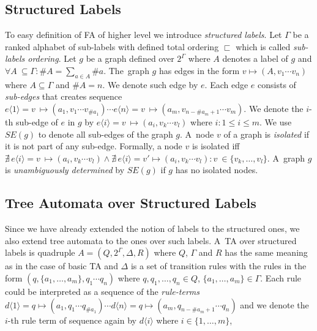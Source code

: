 \subsection{Structured Labels}
\label{subsec:structlab}
To easy definition of FA of higher level we introduce
\emph{structured labels}.
Let $\Gamma$ be a ranked alphabet of sub-labels with defined total ordering $\sqsubset$ which is called \emph{sub-labels ordering}.
Let $g$ be a graph defined over $2^\Gamma$ where $A$ denotes a label of $g$ and $\forall A~\subseteq \Gamma: \#A = \sum_{a\in A} \#a$.
The~graph $g$ has edges in the form $v \mapsto (A,v_1 \cdots v_n)$ where
$A \subseteq \Gamma$ and $\#A = n$.
We denote such edge by $e$.
Each edge $e$ consists of \emph{sub-edges} that creates sequence
$e\langle 1\rangle = v~\mapsto (a_1,v_1 \cdots v_{\#a_1}) \cdots e\langle n\rangle= v~\mapsto (a_m,v_{n-\#a_m+1} \cdots v_m)$.
We denote the $i$-th sub-edge of $e$ in $g$ by $e\langle i\rangle = v~\mapsto (a_i,v_k \cdots v_l)$ where $i: 1 \leq i \leq m$.
We use $SE(g)$ to denote all sub-edges of the graph $g$.
A~node $v$ of a graph is \emph{isolated} if it is not part of any sub-edge.
Formally, a node $v$ is isolated
iff $\nexists\, e\langle i\rangle = v~\mapsto (a_i,v_k \cdots v_l) \wedge \nexists\, e\langle i\rangle = v' \mapsto (a_i,v_k \cdots v_l): v~\in \{v_k,\ldots, v_l\}$.
A~graph $g$ is \emph{unambiguously determined} by $SE(g)$ if $g$ has no isolated nodes.

\subsection{Tree Automata over Structured Labels}

Since we have already extended the notion of labels to the structured ones,
we also extend tree automata to the ones over such labels.
A~TA over structured labels is quadruple $A=(Q,2^\Gamma, \Delta, R)$
where $Q$, $\Gamma$ and $R$ has the same meaning as in the case of basic TA and
	$\Delta$ is a set of transition rules with the rules in the form
		$(q,\{a_1,\ldots,a_m\},q_1 \cdots q_n)$
		where $q,q_1,\ldots,q_n \in Q$, $\{a_1,\ldots,a_m\} \in \Gamma$.
	Each rule could be interpreted as a sequence of the \emph{rule-terms}
	$d\langle 1\rangle = q \mapsto (a_1,q_1 \cdots q_{\#a_1}) \cdots d\langle n\rangle= q \mapsto (a_m,q_{n-\#a_m+1} \cdots q_n)$ and
	we denote the $i$-th rule term of sequence again by $d\langle i\rangle$ where $i \in \{1,\ldots,m\}$,

